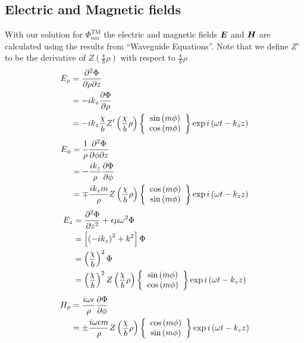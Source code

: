 \documentclass[twoside, a4paper]{article}
\begin{document}


\subsection{Electric and Magnetic fields}
With our solution for $\Phi_{mn}^{\text{TM}}$ the electric and magnetic fields $\mbox{\boldmath$ E $}$ and $\mbox{\boldmath$ H $}$ are calculated using the results from ``Waveguide Equations''. Note that we define $Z'$ to be the derivative of $Z \left( \frac{\chi}{b} \rho \right)$ with respect to $\frac{\chi}{b} \rho$
\begin{align*}
E_\rho 	& = \frac{\partial^2 \Phi}{\partial \rho \partial z} \\
		& = - i k_z \frac{\partial \Phi}{\partial \rho} \\
		& = - i k_z \frac{\chi}{b} 
			Z' \left( \frac{\chi}{b} \rho \right) 
			\left\{
			\begin{array}{c}
			\sin \left( m \phi \right) \\
			\cos \left( m \phi \right)
			\end{array}
			\right\}
			\exp i \left( \omega t - k_z z \right)
\end{align*}
\begin{align*}
E_\phi	& = \frac{1}{\rho} \frac{\partial^2 \Phi}{\partial \phi \partial z} \\
		& = - \frac{i k_z}{\rho} \frac{\partial \Phi}{\partial \phi} \\
		& = \mp \frac{i k_z m}{\rho}
			Z \left( \frac{\chi}{b} \rho \right)
			\left\{
			\begin{array}{c}
			\cos \left( m \phi \right) \\
			\sin \left( m \phi \right)
			\end{array}
			\right\}
			\exp i \left( \omega t - k_z z \right)
\end{align*}
\begin{align*}
E_z		& = \frac{\partial^2 \Phi}{\partial z^2} + \epsilon \mu \omega^2 \Phi \\
		& = \left[ \left( - i k_z \right)^2 + k^2 \right] \Phi \\
		& = \left( \frac{\chi}{b} \right)^2 \Phi \\
		& = \left( \frac{\chi}{b} \right)^2
			Z \left( \frac{\chi}{b} \rho \right)
			\left\{
			\begin{array}{c}
			\sin \left( m \phi \right) \\
			\cos \left( m \phi \right)
			\end{array}
			\right\}
			\exp i \left( \omega t - k_z z \right)	 
\end{align*}
\begin{align*}
H_\rho	& = \frac{i \omega \epsilon}{\rho} \frac{\partial \Phi}{\partial \phi} \\
		& = \pm \frac{i \omega \epsilon m}{\rho}
			Z \left( \frac{\chi}{b} \rho \right)
			\left\{
			\begin{array}{c}
			\cos \left( m \phi \right) \\
			\sin \left( m \phi \right)
			\end{array}
			\right\}
			\exp i \left( \omega t - k_z z \right)	 
\end{align*}
\end{document}
